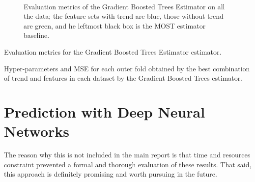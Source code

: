\documentclass[a4paper]{book}
\begin{document}
\begin{figure}[h]
\hfill
{}\\

    \caption{Evaluation metrics of the Gradient Boosted Trees Estimator on all the data; the feature sets with trend are blue, those without trend are green, and he leftmost black box is the MOST estimator baseline.}
	\label{fig:gbr_results_all}
\end{figure}


\begin{table}[h]
\caption{Evaluation metrics for the Gradient Boosted Trees Estimator estimator.}
\label{tbl:gbr_results}

\end{table}


\begin{table}
\caption{Hyper-parameters and MSE for each outer fold obtained by the best combination of trend and features in each dataset by the Gradient Boosted Trees estimator.}
\label{tbl:params_gbt}

\end{table}



\chapter{Prediction with Deep Neural Networks}
\label{apx:deep_learning}
The reason why this is not included in the main report is that time and resources constraint prevented a formal and thorough evaluation of these results. That said, this approach is definitely promising and worth pursuing in the future.
\end{document}
